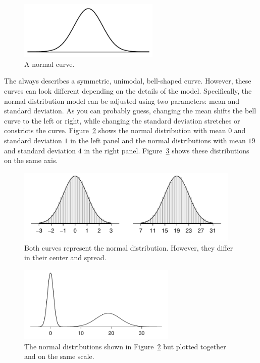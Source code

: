 \begin{figure}[h]
\centering
\includegraphics[width=0.6\textwidth]{ch_distributions/figures/simpleNormal/simpleNormal}
\caption{A normal curve.}
\label{simpleNormal}
\end{figure}

\D{\newpage}

The  always describes a symmetric, unimodal, bell-shaped curve. However, these curves can look different depending on the details of the model. Specifically, the normal distribution model can be adjusted using two parameters: mean and standard deviation. As you can probably guess, changing the mean shifts the bell curve to the left or right, while changing the standard deviation stretches or constricts the curve. Figure~\ref{twoSampleNormals} shows the normal distribution with mean $0$ and standard deviation $1$ in the left panel and the normal distributions with mean $19$ and standard deviation $4$ in the right panel. Figure~\ref{twoSampleNormalsStacked} shows these distributions on the same axis.


\begin{figure}[hht]
\centering
\includegraphics[width=0.95\textwidth]{ch_distributions/figures/twoSampleNormals/twoSampleNormals}
\caption{Both curves represent the normal distribution.  However, they differ in their center and spread. }
\label{twoSampleNormals}
\end{figure}

\begin{figure}[hht]
\centering
\includegraphics[width=0.67\textwidth]{ch_distributions/figures/twoSampleNormalsStacked/twoSampleNormalsStacked}
\caption{The normal distributions shown in Figure~\ref{twoSampleNormals} but plotted together and on the same scale.}
\label{twoSampleNormalsStacked}
\end{figure}


